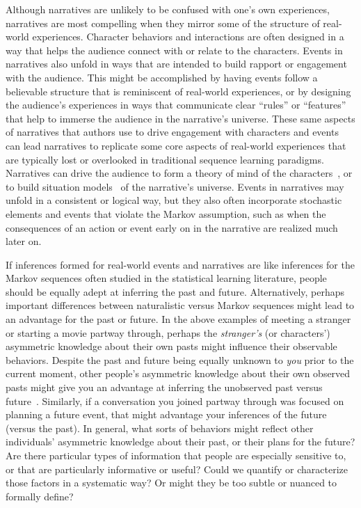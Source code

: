 \documentclass[10pt]{article}
\begin{document}
Although narratives are unlikely to be confused with one's own experiences, narratives are most compelling when they mirror some of the structure of real-world experiences.  Character behaviors and interactions are often designed in a way that helps the audience connect with or relate to the characters.  Events in narratives also unfold in ways that are intended to build rapport or engagement with the audience.  This might be accomplished by having events follow a believable structure that is reminiscent of real-world experiences, or by designing the audience's experiences in ways that communicate clear ``rules'' or ``features'' that help to immerse the audience in the narrative's universe.  These same aspects of narratives that authors use to drive engagement with characters and events can lead narratives to replicate some core aspects of real-world experiences that are typically lost or overlooked in traditional sequence learning paradigms.  Narratives can drive the audience to form a theory of mind of the characters~\citep{TamiThor18}, or to build situation models~\citep{RangRitc12, BoweEtal79} of the narrative's universe.  Events in narratives may unfold in a consistent or logical way, but they also often incorporate stochastic elements and events that violate the Markov assumption, such as when the consequences of an action or event early on in the narrative are realized much later on.

If inferences formed for real-world events and narratives are like inferences for the Markov sequences often studied in the statistical learning literature, people should be equally adept at inferring the past and future.  Alternatively, perhaps important differences between naturalistic versus Markov sequences might lead to an advantage for the past or future.  In the above examples of meeting a stranger or starting a movie partway through, perhaps the \textit{stranger's} (or characters') asymmetric knowledge about their own pasts might influence their observable behaviors.  Despite the past and future being equally unknown to \textit{you} prior to the current moment, other people's asymmetric knowledge about their own observed pasts might give you an advantage at inferring the unobserved past versus future~\citep{PillEtal15}.  Similarly, if a conversation you joined partway through was focused on planning a future event, that might advantage your inferences of the future (versus the past).  In general, what sorts of behaviors might reflect other individuals' asymmetric knowledge about their past, or their plans for the future?  Are there particular types of information that people are especially sensitive to, or that are particularly informative or useful?   Could we quantify or characterize those factors in a systematic way?  Or might they be too subtle or nuanced to formally define?
\end{document}

